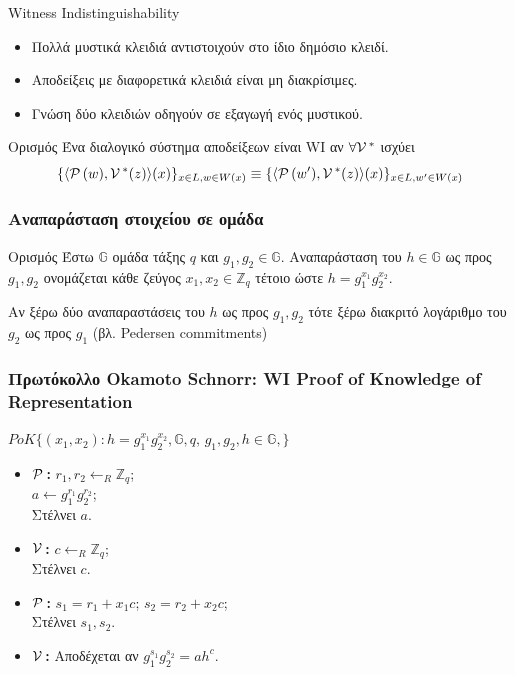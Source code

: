 \documentclass[10pt,handout]{beamer}
\begin{document}
\begin{frame}{Witness Indistinguishability}
\begin{itemize}
	\item Πολλά μυστικά κλειδιά αντιστοιχούν στο ίδιο δημόσιο κλειδί. \pause
	\item Αποδείξεις με διαφορετικά κλειδιά είναι μη διακρίσιμες. \pause
	\item Γνώση δύο κλειδιών οδηγούν σε εξαγωγή ενός μυστικού. 
\end{itemize}
	\pause
\begin{block}{Ορισμός}
	Ένα διαλογικό σύστημα αποδείξεων είναι WI αν $\forall \mathcal{V}\,^*$ ισχύει
	\[
			\{ \langle \mathcal{P}\,(w), \mathcal{V}\,^*(z) \rangle(x)\}_{x\in L,w\in W(x)} \stackrel{\ }{\equiv}
			\{ \langle \mathcal{P}\,(w'), \mathcal{V}\,^*(z) \rangle(x) \}_{x\in L,w'\in W(x)}
	\]
\end{block}

\end{frame}
  
\begin{frame}
\frametitle{Αναπαράσταση στοιχείου σε ομάδα}
\begin{block}{Ορισμός}
	Έστω $\mathbb{G}$ ομάδα τάξης $q$ και $g_1,g_2\in \mathbb{G}$. Αναπαράσταση του $h\in \mathbb{G}$ ως προς $g_1,g_2$ ονομάζεται κάθε ζεύγος $x_1,x_2\in \mathbb{Z}_q$ τέτοιο ώστε $h=g_1^{x_1}g_2^{x_2}$.
\end{block}
\pause
\alert{Αν ξέρω δύο αναπαραστάσεις του $h$ ως προς $g_1,g_2$ τότε ξέρω διακριτό λογάριθμο του $g_2$ ως προς $g_1$ (βλ. Pedersen commitments)}
\end{frame}
  
  
\begin{frame}\frametitle{Πρωτόκολλο Okamoto Schnorr: WI Proof of Knowledge of Representation}
$PoK \big\{(x_1,x_2): h=g_1^{x_1}g_2^{x_2}, \mathbb{G},q, \, g_1,g_2,h \in \mathbb{G}, \big\}$ \pause 
\begin{itemize}
	\item \textbf{$\mathcal{P}\,$:} 
	$r_1,r_2\leftarrow_R \mathbb{Z}_q$;\;   \\
	$a \leftarrow g_1^{r_1}g_2^{r_2}$;\;    \\ 
	Στέλνει $a$. \pause 
	\item \textbf{$\mathcal{V}\,$:} 
	$c\leftarrow_R \mathbb{Z}_q$;\;    \\
	Στέλνει $c$. \pause 
	\item \textbf{$\mathcal{P}\,$:} 
	$s_1=r_1+x_1c$;\; $s_2=r_2+x_2c$; \\ 
	Στέλνει $s_1,s_2$. \pause 
	\item \textbf{$\mathcal{V}\,$:} 
	Αποδέχεται αν $g_1^{s_1}g_2^{s_2}=ah^{c}$.
\end{itemize}
\end{frame}
	 
\end{document}
